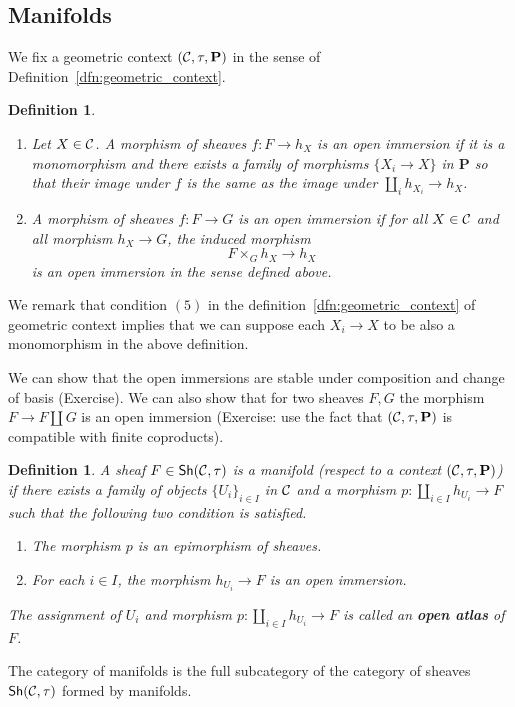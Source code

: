 \documentclass{tufte-book} %
\numberwithin{dummy}{section}
\newtheorem{dfn}[thm]{Definition}
\newcommand{\calc}{{\cal C}}
\newcommand{\lrta}{\longrightarrow}
\newcommand{\ssh}{\mathsf{Sh}}
\newcommand{\bfp}{\mathbf{P}}
\begin{document}
\subsection{Manifolds}
We fix a geometric context $(\calc,\tau,\bfp)$ in the sense of Definition~\ref{dfn:geometric_context}.
\begin{dfn}\ 
\begin{enumerate}
\item Let $X\in \calc$. A morphism of sheaves $f:F\lrta h_X$ is an open immersion if it is a monomorphism and there exists a family of morphisms $\{X_i\lrta X\}$ in $\bfp$ so that their image under $f$ is the same as the image under $\coprod_i h_{X_i}\lrta h_X$.
\item A morphism of sheaves $f:F\lrta G$ is an open immersion if for all $X\in\calc$ and all morphism $h_X\lrta G$, the induced morphism 
$$
F\times_G h_X\lrta h_X
$$
is an open immersion in the sense defined above.
\end{enumerate}
\end{dfn}
We remark that condition $(5)$ in the definition~\ref{dfn:geometric_context} of geometric context implies that we can suppose each $X_i\lrta X$ to be also a monomorphism in the above definition.

We can show that the open immersions are stable under composition and change of basis (Exercise). We can also show that for two sheaves $F,G$ the morphism $F\lrta F\coprod G$ is an open immersion (Exercise: use the fact that $(\calc,\tau,\bfp)$ is compatible with finite coproducts).

\begin{dfn}
A sheaf $F\in \ssh(\calc,\tau)$ is a manifold (respect to a context $(\calc,\tau,\bfp)$) if there exists a family of objects $\{U_i\}_{i\in I}$ in $\calc$ and a morphism $p:\coprod_{i\in I}h_{U_i}\lrta F$ such that the following two condition is satisfied.
\begin{enumerate}
\item The morphism $p$ is an epimorphism of sheaves.
\item For each $i\in I$, the morphism $h_{U_i}\lrta F$ is an open immersion.
\end{enumerate}
The assignment of $U_i$ and morphism $p:\coprod_{i\in I} h_{U_i}\lrta F$ is called an \textbf{open atlas} of $F$.
\end{dfn}
The category of manifolds is the full subcategory of the category of sheaves $\ssh(\calc,\tau)$ formed by manifolds.
\end{document}

